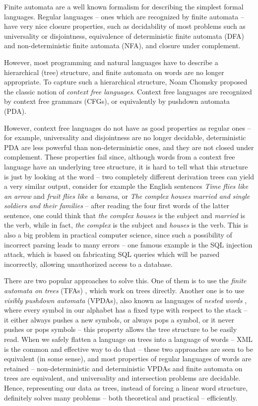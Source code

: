 \documentclass{article}
\begin{document}
Finite automata are a well known formalism for describing the simplest formal languages.
Regular languages -- ones which are recognized by finite automata -- have very nice
closure properties, such as decidability of most problems such as universality or
disjointness, equivalence of deterministic finite automata (DFA) and non-deterministic
finite automata (NFA), and closure under complement.

However, most programming and natural languages have to describe a hierarchical (tree)
structure, and finite automata on words are no longer appropriate.
To capture such a hierarchical structure,
Noam Chomsky proposed the classic notion of \emph{context free languages}.
Context free languages are recognized
by context free grammars (CFGs), or equivalently by pushdown automata (PDA).

However, context free languages do not have as good properties as regular ones --
for example, universality and disjointness are no longer decidable, deterministic
PDA are less powerful than non-deterministic ones, and they are not closed under
complement. These properties fail since, although
words from a context free language have an underlying tree structure, it is hard
to tell what this structure is just by looking at the word -- two completely different
derivation trees can yield a very similar output, consider for example the English
sentences \emph{Time flies like an arrow} and \emph{fruit flies like a banana}, 
or \emph{The complex houses married and single soldiers and their families} -- after
reading the four first words of the latter sentence, one could think that 
\emph{the complex houses} is the subject and \emph{married} is the verb, while in fact,
\emph{the complex} is the subject and \emph{houses} is the verb. This is also a big
problem in practical computer science, since such a possibility of incorrect parsing leads to many errors
-- one famous example is the SQL injection attack, which is based on fabricating
SQL queries which will be parsed incorrectly, allowing unauthorized access to a database.

There are two popular approaches to solve this. One of them is to use the 
\emph{finite automata on trees} (TFAs) \cite{tata}, which work on trees directly. Another one is to
use \emph{visibly pushdown automata} (VPDAs), also known as languages of \emph{nested
words} \cite{visibly}, where every symbol in our alphabet has a fixed type
with respect to the stack -- it either always pushes a new symbols, or always pops a
symbol, or it never pushes or pops symbols -- this property allows the tree structure to be easily
read. When we safely flatten a language on trees into a language of words -- XML is the
common and effective way to do that -- these two approaches are seen to be equivalent
(in some sense), and most properties of regular languages of words are retained --
non-deterministic and deterministic VPDAs and finite automata on trees are equivalent,
and universality and intersection problems are decidable. Hence,
representing our data as trees, instead of forcing a linear word structure,
definitely solves many problems -- both theoretical and practical -- efficiently.
\end{document}
